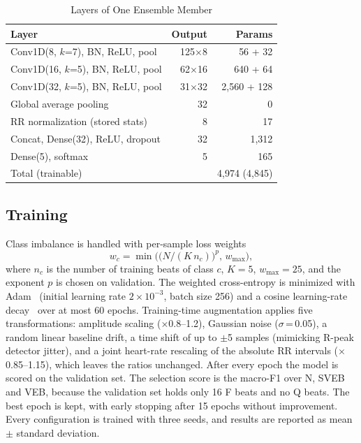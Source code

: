 \documentclass[conference]{IEEEtran}
\begin{document}
\begin{table}[t]
\caption{Layers of One Ensemble Member}
\label{tab:arch}
\centering
\footnotesize
\begin{tabular}{@{}lrr@{}}
\toprule
Layer & Output & Params \\
\midrule
Conv1D(8, $k$=7), BN, ReLU, pool & 125$\times$8 & 56 + 32 \\
Conv1D(16, $k$=5), BN, ReLU, pool & 62$\times$16 & 640 + 64 \\
Conv1D(32, $k$=5), BN, ReLU, pool & 31$\times$32 & 2,560 + 128 \\
Global average pooling & 32 & 0 \\
RR normalization (stored stats) & 8 & 17 \\
Concat, Dense(32), ReLU, dropout & 32 & 1,312 \\
Dense(5), softmax & 5 & 165 \\
\midrule
Total (trainable) & & 4,974 (4,845) \\
\bottomrule
\end{tabular}
\end{table}

\subsection{Training}
Class imbalance is handled with per-sample loss weights
\begin{equation}
w_c=\min\!\Big(\big(N/(K\,n_c)\big)^{p},\,w_{\max}\Big),
\end{equation}
where $n_c$ is the number of training beats of class $c$, $K=5$, $w_{\max}=25$, and the exponent $p$ is chosen on validation. The weighted cross-entropy is minimized with Adam~\cite{kingma2015adam} (initial learning rate $2\times10^{-3}$, batch size 256) and a cosine learning-rate decay~\cite{loshchilov2017sgdr} over at most 60 epochs. Training-time augmentation applies five transformations: amplitude scaling ($\times$0.8--1.2), Gaussian noise ($\sigma$\,=\,0.05), a random linear baseline drift, a time shift of up to $\pm$5 samples (mimicking R-peak detector jitter), and a joint heart-rate rescaling of the absolute RR intervals ($\times$0.85--1.15), which leaves the ratios unchanged. After every epoch the model is scored on the validation set. The selection score is the macro-F1 over N, SVEB and VEB, because the validation set holds only 16 F beats and no Q beats. The best epoch is kept, with early stopping after 15 epochs without improvement. Every configuration is trained with three seeds, and results are reported as mean $\pm$ standard deviation.
\end{document}
